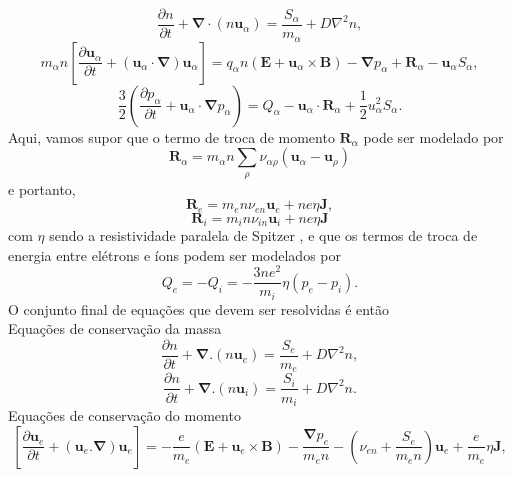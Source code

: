 \documentclass[12pt,oneside,a4paper]{abntex2}
\begin{document}
\begin{equation}
\frac{\partial n}{\partial t} + \bm{\nabla} \cdot (n \bm{u}_\alpha) = \frac{S_\alpha}{m_\alpha}+D\nabla^2 n,
\end{equation}
\begin{equation}
m_\alpha n \left[ \frac{\partial \bm{u}_\alpha}{\partial t} + (\bm{u}_\alpha \cdot \bm{\nabla})\bm{u}_\alpha \right] =  q_\alpha n (\bm{E}+\bm{u}_\alpha \times \bm{B}) - \bm{\nabla} p_\alpha + \bm{R}_\alpha - \bm{u}_\alpha S_\alpha,
\end{equation}
\begin{equation} 
\frac{3}{2} \left( \frac{\partial p_\alpha}{\partial t} + \bm{u}_\alpha \cdot \bm{\nabla} p_\alpha \right) =Q_\alpha -\bm{u}_\alpha \cdot \bm{R}_\alpha + \frac{1}{2} u^2_\alpha S_\alpha .
\end{equation}
Aqui, vamos supor que o termo de troca de momento $\bm{R}_\alpha$ pode ser modelado por
\begin{equation}
\bm{R}_\alpha = m_\alpha n \sum_\rho  \nu_{\alpha \rho}(\bm{u}_\alpha - \bm{u}_\rho)
\end{equation}
e portanto,
\begin{equation}
\bm{R}_e = m_e n \nu_{en}\bm{u}_e+ne\eta \bm{J},
\end{equation}
\begin{equation}
\bm{R}_i = m_i n \nu_{in}\bm{u}_i+ne\eta \bm{J}
\end{equation}
com $\eta$ sendo a resistividade paralela de Spitzer \cite[cap 2.16]{tokamaks}, e que os termos de troca de energia entre elétrons e íons podem ser modelados por
\begin{equation}
Q_e = -Q_i = -\frac{3ne^2}{m_i} \eta (p_e-p_i) .
\end{equation}
O conjunto final de equações que devem ser resolvidas é então\\
Equações de conservação da massa
\begin{equation}
\label{eq: pit1}
\frac{\partial n}{\partial t} + \bm{\nabla}.(n \bm{u}_e) = \frac{S_e}{m_e}+D\nabla^2 n,
\end{equation}
\begin{equation} 
\label{eq: pit2}
\frac{\partial n}{\partial t} + \bm{\nabla}.(n \bm{u}_i) = \frac{S_i}{m_i}+D\nabla^2 n .
\end{equation}
Equações de conservação do momento
\begin{equation}
\label{eq: pit51}
\left[\frac{\partial \bm{u}_e}{\partial t} + (\bm{u}_e . \bm{\nabla})\bm{u}_e\right] = - \frac{e}{m_e} (\bm{E}+\bm{u}_e \times \bm{B}) - \frac{\bm{\nabla} p_e}{m_e n} - \left(\nu_{en}+\frac{S_e}{m_e n} \right)\bm{u}_e + \frac{e}{m_e}\eta \bm{J}, 
\end{equation}
\end{document}
